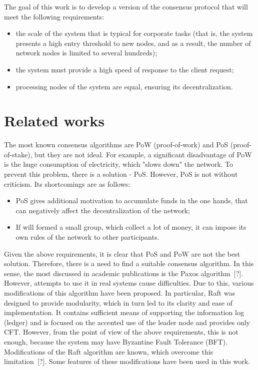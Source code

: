 \documentclass[12pt, a5paper]{article}
\begin{document}
The goal of this work is to develop a version of the consensus protocol that will meet the following requirements:
\begin{itemize}
\item the scale of the system that is typical for corporate tasks (that is, the system presents a high entry threshold to new nodes, and as a result, the number of network nodes is limited to several hundreds);
\item the system must provide a high speed of response to the client request;
\item processing nodes of the system are equal, ensuring its decentralization.
\end{itemize}
\section{Related works}

The most known consensus algorithms are PoW (proof-of-work) and PoS (proof-of-stake), but they are not ideal. For example, a significant disadvantage of PoW is the huge consumption of electricity, which "slows down" the network. To prevent this problem, there is a solution - PoS. However, PoS is not without criticism. Its shortcomings are as follows:
\begin{itemize}
\item PoS gives additional motivation to accumulate funds in the one hands, that can negatively affect the decentralization of the network;
\item If will formed a small group, which collect a lot of money, it can impose its own rules of the network to other participants.
\end{itemize}
Given the above requirements, it is clear that PoS and PoW are not the best solution. Therefore, there is a need to find a suitable consensus algorithm. In this sense, the most discussed in academic publications is the Paxos algorithm~[?]. However, attempts to use it in real systems cause difficulties. Due to this, various modifications of this algorithm have been proposed. In particular, Raft was designed to provide modularity, which in turn led to its clarity and ease of implementation. It contains sufficient means of supporting the information log (ledger) and is focused on the accented use of the leader node and provides only CFT. However, from the point of view of the above requirements, this is not enough, because the system may have Byzantine Fault Tolerance (BFT). Modifications of the Raft algorithm are known, which overcome this limitation~[?]. Some features of these modifications have been used in this work.
\end{document}
